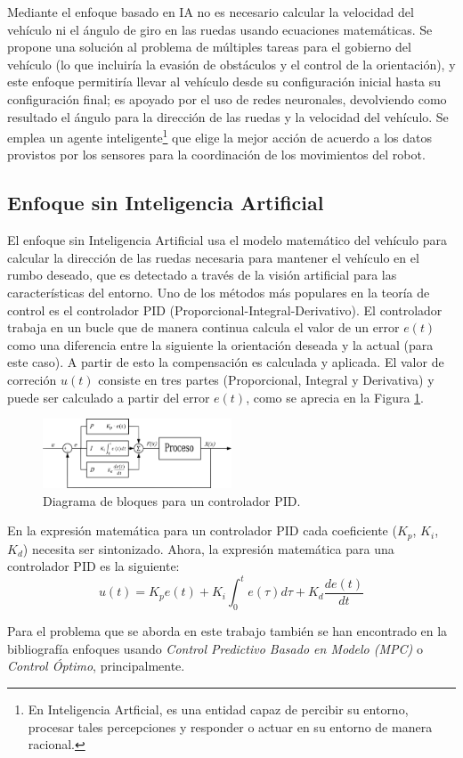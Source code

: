 \par Mediante el enfoque basado en IA no es necesario calcular la velocidad del vehículo ni el ángulo de giro en las ruedas usando ecuaciones matemáticas. Se propone una solución al problema de múltiples tareas para el gobierno del vehículo (lo que incluiría la evasión de obstáculos y el control de la orientación), y este enfoque permitiría llevar al vehículo desde su configuración inicial hasta su configuración final; es apoyado por el uso de redes neuronales, devolviendo como resultado el ángulo para la dirección de las ruedas y la velocidad del vehículo. Se emplea un agente inteligente\footnote{En Inteligencia Artficial, es una entidad capaz de percibir su entorno, procesar tales percepciones y responder o actuar en su entorno de manera racional.} que elige la mejor acción de acuerdo a los datos provistos por los sensores para la coordinación de los movimientos del robot. 
\subsection{Enfoque sin Inteligencia Artificial}
El enfoque sin Inteligencia Artificial usa el modelo matemático del vehículo para calcular la dirección de las ruedas necesaria para mantener el vehículo en el rumbo deseado, que es detectado a través de la visión artificial para las características del entorno. Uno de los métodos más populares en la teoría de control es el controlador PID (Proporcional-Integral-Derivativo). El controlador trabaja en un bucle que de manera continua calcula el valor de un error $e(t)$ como una diferencia entre la siguiente la orientación deseada y la actual (para este caso). A partir de esto la compensación es calculada y aplicada. El valor de correción $u(t)$ consiste en tres partes (Proporcional, Integral y Derivativa) y puede ser calculado a partir del error $e(t)$, como se aprecia en la Figura \ref{fig:PID}.
\begin{figure}[htbp!]
	\centering
	\includegraphics[width=0.5\textwidth]{./Figuras/PID}
	\caption{Diagrama de bloques para un controlador PID.}
	\label{fig:PID}
\end{figure}
\par En la expresión matemática para un controlador PID cada coeficiente ($K_{p}$, $K_{i}$, $K_{d}$) necesita ser sintonizado. Ahora, la expresión matemática para una controlador PID es la siguiente:
\[u(t)=K_{p}e(t)+K_{i}\int_{0}^{t}e(\tau)d\tau+K_{d}\frac{de(t)}{dt}\]
\par Para el problema que se aborda en este trabajo también se han encontrado en la bibliografía enfoques usando {\it Control Predictivo Basado en Modelo (MPC)} o {\it Control Óptimo}, principalmente. 
